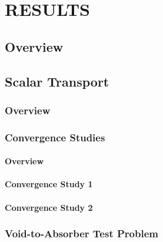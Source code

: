 \chapter{RESULTS}

\section{Overview}
  
\section{Scalar Transport\label{sec:transport_results}}
\subsection{Overview}
  
\subsection{Convergence Studies\label{sec:convergence}}
  \subsubsection{Overview\label{sec:convergence_overview}}
    
  \subsubsection{Convergence Study 1\label{sec:mms_sinx_ss}}
    
  \subsubsection{Convergence Study 2\label{sec:absorber_ss}}
    
\subsection{Void-to-Absorber Test Problem\label{sec:void_to_absorber}}
  
